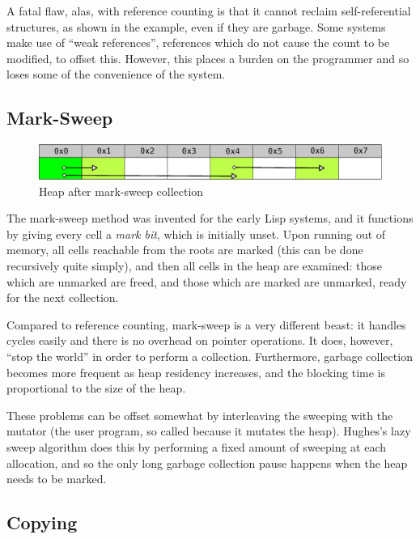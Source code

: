 A fatal flaw, alas, with reference counting is that it cannot reclaim
self-referential structures, as shown in the example, even if they are
garbage\cite{McBeth63}. Some systems make use of ``weak references'',
references which do not cause the count to be modified, to offset
this\cite{Brown95}. However, this places a burden on the programmer
and so loses some of the convenience of the system.

\subsection{Mark-Sweep}
\label{sec:lit-gc-marksweep}

\begin{figure}[h]
  \centering
  \includegraphics[width=\textwidth]{lit-gc-marksweep}
  \caption{Heap after mark-sweep collection}
  \label{fig:lit-gc-marksweep}
\end{figure}

The mark-sweep method was invented for the early Lisp
systems\cite{McCarthy60}, and it functions by giving every cell a
\textit{mark bit}, which is initially unset. Upon running out of
memory, all cells reachable from the roots are marked (this can be
done recursively quite simply), and then all cells in the heap are
examined: those which are unmarked are freed, and those which are
marked are unmarked, ready for the next
collection\cite{GarbageCollection}.

Compared to reference counting, mark-sweep is a very different beast:
it handles cycles easily and there is no overhead on pointer
operations. It does, however, ``stop the world'' in order to perform a
collection\cite{GarbageCollection}. Furthermore, garbage collection
becomes more frequent as heap residency increases\cite{McCarthy60},
and the blocking time is proportional to the size of the
heap\cite{Appel87}.

These problems can be offset somewhat by interleaving the sweeping
with the mutator (the user program, so called because it mutates the
heap\cite{Dijkstra78}). Hughes's lazy sweep algorithm\cite{Hughes82}
does this by performing a fixed amount of sweeping at each allocation,
and so the only long garbage collection pause happens when the heap
needs to be marked.

\subsection{Copying}
\label{sec:lit-gc-copying}

